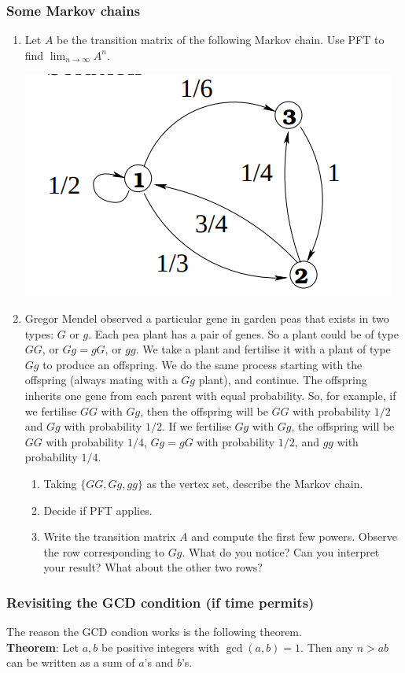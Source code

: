 \documentclass{amsart}
\begin{document}
\subsubsection{Some Markov chains}
\label{sec:orgeeb4c38}
\begin{enumerate}
\item Let \(A\) be the transition matrix of the following Markov chain.
Use PFT to find \(\lim_{n \to \infty} A^n\).
\begin{center}
\includegraphics[width=.5\linewidth]{assets/Worksheets/2024-09-11_16-39-26_screenshot.png}
\end{center}

\item Gregor Mendel observed a particular gene in garden peas that exists in two types: \(G\) or \(g\).
Each pea plant has a pair of genes.
So a plant could be of type \(GG\), or \(Gg = gG\), or \(gg\).
We take a plant and fertilise it with a plant of type \(Gg\) to produce an offspring.
We do the same process starting with the offspring (always mating with a \(Gg\) plant), and continue.
The offspring inherits one gene from each parent with equal probability.
So, for example, if we fertilise \(GG\) with \(Gg\), then the offspring will be \(GG\) with probability \(1/2\) and \(Gg\) with probability \(1/2\).
If we fertilise \(Gg\) with \(Gg\), the offspring will be \(GG\) with probability \(1/4\), \(Gg = gG\) with probability \(1/2\), and \(gg\) with probability \(1/4\).

\begin{enumerate}
\item Taking \(\{GG, Gg, gg\}\) as the vertex set, describe the Markov chain.
\item Decide if PFT applies.
\item Write the transition matrix \(A\) and compute the first few powers.
Observe the row corresponding to \(Gg\).
What do you notice?
Can you interpret your result?
What about the other two rows?
\end{enumerate}
\end{enumerate}
\subsubsection{Revisiting the GCD condition (if time permits)}
\label{sec:org5f8a081}
The reason the GCD condion works is the following theorem.\\
\textbf{\textbf{Theorem}}:  Let \(a, b\) be positive integers with \(\gcd(a,b) = 1\).
Then any \(n > ab\) can be written as a sum of \(a\)'s and \(b\)'s.
\end{document}

